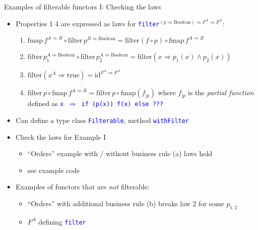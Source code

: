 \documentclass[english]{beamer}
\begin{document}
\begin{frame}{Examples of filterable functors I: Checking the laws}

\begin{itemize}
\item Properties 1 \textendash{} 4 are expressed as laws for \texttt{\textcolor{blue}{\footnotesize{}filter}}$^{(p\Rightarrow\text{Boolean})\Rightarrow F^{A}\Rightarrow F^{A}}$:
\begin{enumerate}
\item {\footnotesize{}$\text{fmap}\,f^{A\Rightarrow B}\circ\text{filter}\,p^{B\Rightarrow\text{Boolean}}=\text{filter}\left(f\circ p\right)\circ\text{fmap}\,f^{A\Rightarrow B}$}{\footnotesize \par}
\item {\footnotesize{}$\text{filter}\,p_{1}^{A\Rightarrow\text{Boolean}}\circ\text{filter}\,p_{2}^{A\Rightarrow\text{Boolean}}=\text{filter}\left(x\Rightarrow p_{1}(x)\wedge p_{2}(x)\right)$}{\footnotesize \par}
\item {\footnotesize{}$\text{filter}\left(x^{A}\Rightarrow\text{true}\right)=\text{id}^{F^{A}\Rightarrow F^{A}}$ }{\footnotesize \par}
\item {\footnotesize{}$\text{filter}\,p\circ\text{fmap}\,f^{A\Rightarrow B}=\text{filter}\,p\circ\text{fmap}\left(f_{|p}\right)$
}where {\footnotesize{}$f_{|p}$} is the \emph{partial function} defined
as \texttt{\textcolor{blue}{\footnotesize{}x $\Rightarrow$ if (p(x))
f(x) else ???}} 
\end{enumerate}
\item Can define a type class \texttt{\textcolor{blue}{\footnotesize{}Filterable}},
method \texttt{\textcolor{blue}{\footnotesize{}withFilter}} 
\item Check the laws for Example I
\begin{itemize}
\item ``Orders'' example with / without business rule (a) \textendash{}
laws hold
\item see example code
\end{itemize}
\item Examples of functors that are \emph{not} filterable:
\begin{itemize}
\item ``Orders'' with additional business rule (b) \textendash{} breaks
law 2 for some $p_{1,2}$
\item $F^{A}$ defining \texttt{\textcolor{blue}{\footnotesize{}filter}}

\end{itemize}
\end{itemize}
\end{frame}
\end{document}
